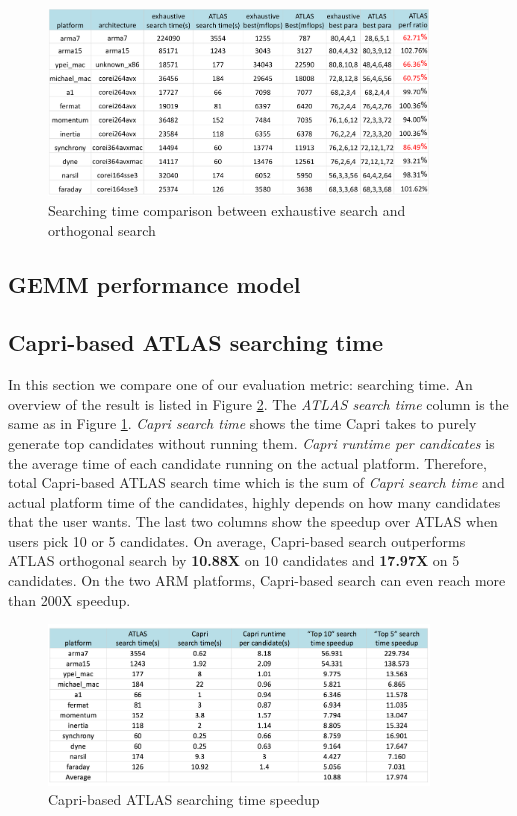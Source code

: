   \begin{figure}[tbhp]
    \centering
    \includegraphics[width=0.9\textwidth]{images/exhaustiveVsorthogonal.png}
    \caption{Searching time comparison between exhaustive search and \atl orthogonal search}
    \label{fig:exhaustiveVsorthogonal}
  \end{figure}

  \subsection{GEMM performance model}
  \label{sec:GEMMperf}

  \subsection{Capri-based ATLAS searching time}
  \label{sec:capri_atlas_searching}
  In this section we compare one of our evaluation metric: searching time. An overview of the result is listed in
  Figure \ref{fig:search_time}. The \textit{ATLAS search time} column is the same as in Figure \ref{fig:exhaustiveVsorthogonal}.
  \textit{Capri search time} shows the time Capri takes to purely generate top candidates without running them. 
  \textit{Capri runtime per candicates} is the average time of each candidate running on the actual platform.
  Therefore, total Capri-based ATLAS search time which is the sum of \textit{Capri search time} and actual platform time of the candidates,
  highly depends on how many candidates that the user wants. The last two columns show the speedup over ATLAS when users pick
  10 or 5 candidates. On average, Capri-based search outperforms ATLAS orthogonal search by \textbf{10.88X} on 10 candidates and \textbf{17.97X} on 
  5 candidates. On the two ARM platforms, Capri-based search can even reach more than 200X speedup.
  


  \begin{figure}[tbhp]
    \centering
    \includegraphics[width=0.9\textwidth]{images/timespeedup.png}
    \caption{Capri-based ATLAS searching time speedup}
    \label{fig:search_time}
  \end{figure}

